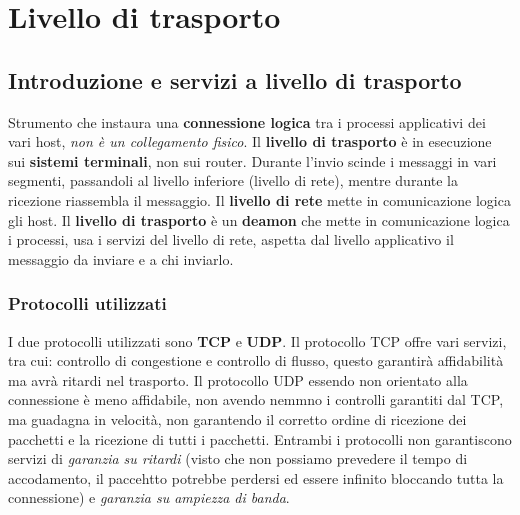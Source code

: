 \section{Livello di trasporto}

\subsection{Introduzione e servizi a livello di trasporto}
Strumento che instaura una \textbf{connessione logica} tra i processi applicativi dei vari host, \textit{non è un collegamento fisico}.
Il \textbf{livello di trasporto} è in esecuzione sui \textbf{sistemi terminali}, non sui router. \newline
Durante l'invio scinde i messaggi in vari segmenti, passandoli al livello inferiore (livello di rete), mentre durante la ricezione riassembla il messaggio. \newline
Il \textbf{livello di rete} mette in comunicazione logica gli host. \newline
Il \textbf{livello di trasporto} è un \textbf{deamon} che mette in comunicazione logica i processi, usa i servizi del livello di rete, aspetta dal livello applicativo il messaggio da inviare e a chi inviarlo.

\subsubsection{Protocolli utilizzati}
I due protocolli utilizzati sono \textbf{TCP} e \textbf{UDP}. 
Il protocollo TCP offre vari servizi, tra cui: controllo di congestione e controllo di flusso, questo garantirà affidabilità ma avrà ritardi nel trasporto. \newline
Il protocollo UDP essendo non orientato alla connessione è meno affidabile, non avendo nemmno i controlli garantiti dal TCP, ma guadagna in velocità, non garantendo il corretto ordine di ricezione dei pacchetti e la ricezione di tutti i pacchetti. \newline
Entrambi i protocolli non garantiscono servizi di \textit{garanzia su ritardi} (visto che non possiamo prevedere il tempo di accodamento, il paccehtto potrebbe perdersi ed essere infinito bloccando tutta la connessione) e \textit{garanzia su ampiezza di banda}.

